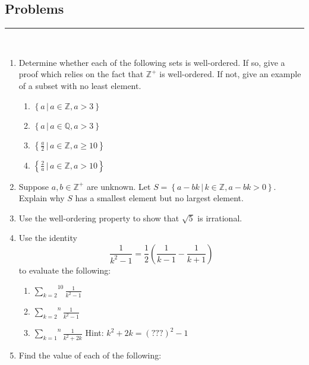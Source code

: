 \documentclass[class=article, crop=false]{standalone}
\def\integers{{\mathbb Z}}
\def\rationals{{\mathbb Q}}
\def\inlinesum#1#2{\overset{#2}{\underset{#1}{\sum}}}
\begin{document}
\subsection{Problems}
\rule{\textwidth}{1pt}\\
\begin{enumerate}
\item
  Determine whether each of the following sets is well-ordered.  If
  so, give a proof which relies on the fact that $\integers^+$ is well-ordered.
  If not, give an example of a subset with no least element.
  \begin{enumerate}
  \item $\left\{a\,\big|\, a\in\integers,a>3\right\}$

  \item
	$\left\{a\,\big|\, a\in\rationals,a>3\right\}$

  \item
	$\left\{\frac a2\,\big|\, a\in\integers,a\geq 10\right\}$


  \item
	$\left\{\frac 2a\,\big|\, a\in\integers,a>10\right\}$

  \end{enumerate}

\item
  Suppose $a,b\in\integers^+$ are unknown.  Let
  $S=\left\{a-bk\,\big|\, k\in\integers,a-bk>0\right\}$.
  Explain why $S$ has a smallest element but no largest element.

\item
  Use the well-ordering property to show that
  $\sqrt 5$ is irrational.

\item
  Use the identity
  $$\frac1{k^2-1}=\frac12\left(\frac1{k-1}-\frac1{k+1}\right)$$
  to evaluate the following:

  \begin{enumerate}

  \item
	$\inlinesum{k=2}{10}\frac1{k^2-1}$

  \item
	$\inlinesum{k=2}{n}\frac1{k^2-1}$

  \item
	$\inlinesum{k=1}{n}\frac1{k^2+2k}$
	\hspace{10pt}Hint: $k^2+2k=(???)^2-1$

  \end{enumerate}

\item
  Find the value of each of the following:


\end{enumerate}
\end{document}
